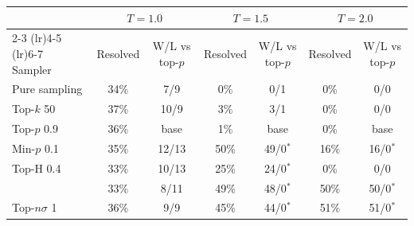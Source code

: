 \begin{tabular}{lcccccc}
\toprule
 & \multicolumn{2}{c}{$T{=}1.0$} & \multicolumn{2}{c}{$T{=}1.5$} & \multicolumn{2}{c}{$T{=}2.0$} \\
\cmidrule(lr){2-3} \cmidrule(lr){4-5} \cmidrule(lr){6-7}
Sampler & Resolved & W/L vs top-$p$ & Resolved & W/L vs top-$p$ & Resolved & W/L vs top-$p$ \\
\midrule
Pure sampling & 34\% & 7/9 & 0\% & 0/1 & 0\% & 0/0 \\
Top-$k$ 50 & 37\% & 10/9 & 3\% & 3/1 & 0\% & 0/0 \\
Top-$p$ 0.9 & 36\% & base & 1\% & base & 0\% & base \\
Min-$p$ 0.1 & 35\% & 12/13 & 50\% & 49/0$^{*}$ & 16\% & 16/0$^{*}$ \\
Top-H 0.4 & 33\% & 10/13 & 25\% & 24/0$^{*}$ & 0\% & 0/0 \\
\pless{} & 33\% & 8/11 & 49\% & 48/0$^{*}$ & 50\% & 50/0$^{*}$ \\
Top-$n\sigma$ 1 & 36\% & 9/9 & 45\% & 44/0$^{*}$ & 51\% & 51/0$^{*}$ \\
\bottomrule
\end{tabular}
